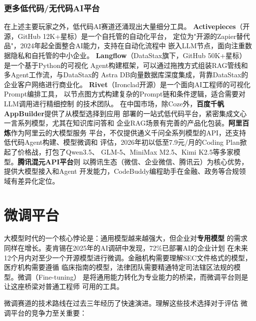 \subsubsection{更多低代码/无代码AI平台}
在上述主要玩家之外，低代码AI赛道还涌现出大量细分工具。
\textbf{Activepieces}（开源，GitHub 12K+星标）是一个自托管的自动化平台，
定位为"开源的Zapier替代品"，2024年起全面整合AI能力，支持在自动化流程中
嵌入LLM节点，面向注重数据隐私和自托管的中小企业。
\textbf{Langflow}（DataStax旗下，GitHub 50K+星标）是一个基于Python的可视化
Agent构建框架，可以通过拖拽方式组装RAG管线和多Agent工作流，与DataStax的
Astra DB向量数据库深度集成，背靠DataStax的企业客户网络进行商业化。
\textbf{Rivet}（Ironclad开源）是一个面向AI工程师的可视化Prompt编排工具，
以节点图方式构建复杂的Prompt链和条件逻辑，适合需要对LLM调用进行精细控制
的技术团队。
在中国市场，除Coze外，\textbf{百度千帆AppBuilder}提供了从模型选择到应用
部署的一站式低代码平台，紧密集成文心一言系列模型，尤其在知识库问答和
企业RAG场景有完善的产品化包装。\textbf{阿里百炼}作为阿里云的大模型服务
平台，不仅提供通义千问全系列模型的API，还支持低代码Agent构建、模型微调和
评估，2026年初以低至7.9元/月的Coding Plan掀起了价格战，打包了Qwen3.5、
GLM-5、MiniMax M2.5、Kimi K2.5等多家模型。\textbf{腾讯混元API平台}则
以腾讯生态（微信、企业微信、腾讯云）为核心优势，提供大模型接入和Agent
开发能力，CodeBuddy编程助手在金融、政务等合规领域有差异化定位。


\section{微调平台}
\label{sec:platform-finetune}

大模型时代的一个核心悖论是：通用模型越来越强大，但企业对\textbf{专用模型}
的需求同样在增长。麦肯锡在2025年的AI调研中发现，72\%已部署AI的企业计划
在未来12个月内对至少一个开源模型进行微调。金融机构需要理解SEC文件格式的模型，医疗机构需要遵循
临床指南的模型，法律团队需要精通特定司法辖区法规的模型。微调（Fine-tuning）
是将通用能力转化为专业能力的桥梁，而微调平台则是让这座桥梁对普通工程师
可用的工具。

微调赛道的技术路线在过去三年经历了快速演进。理解这些技术选择对于评估
微调平台的竞争力至关重要：

